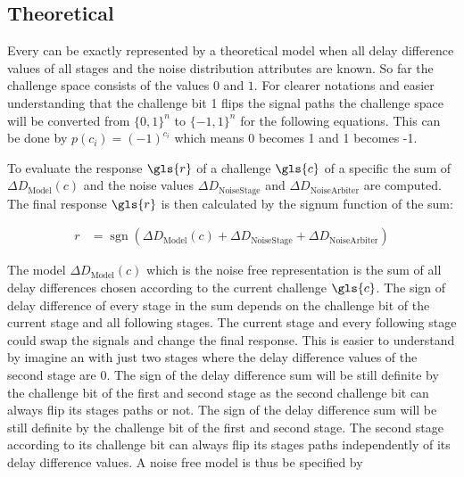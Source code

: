 
\subsection{Theoretical}
\label{sec:theoretical}

Every \apuf can be exactly represented by a theoretical model when all delay difference values of all stages and the noise distribution attributes are known.
So far the challenge space consists of the values $0$ and $1$.
For clearer notations and easier understanding that the challenge bit 1 flips the signal paths the challenge space will be converted from $\{0, 1\}^n$ to $\{-1, 1\}^n$ for the following equations.
This can be done by $p(c_i) = (-1)^{c_i}$ which means 0 becomes 1 and 1 becomes -1.

To evaluate the response $\gls{r}$ of a challenge $\gls{c}$ of a specific \puf the sum of $\Delta D_{\mathrm{Model}}(c)$ and the noise values $\Delta D_{\mathrm{Noise Stage}}$ and $\Delta D_{\mathrm{Noise Arbiter}}$ are computed.
The final response $\gls{r}$ is then calculated by the signum function of the sum:

\begin{align}
r &= \operatorname{sgn}(\Delta D_{\mathrm{Model}}(c) + \Delta D_{\mathrm{Noise Stage}} + \Delta D_{\mathrm{Noise Arbiter}}) \label{equ:pufresponse}
\end{align}

The model $\Delta D_{\mathrm{Model}}(c)$ which is the noise free \apuf representation is the sum of all delay differences chosen according to the current challenge $\gls{c}$.
The sign of delay difference of every stage in the sum depends on the challenge bit of the current stage and all following stages.
The current stage and every following stage could swap the signals and change the final response.
This is easier to understand by imagine an \apuf with just two stages where the delay difference values of the second stage are 0. 
The sign of the delay difference sum will be still definite by the challenge bit of the first and second stage as the second challenge bit can always flip its stages paths or not.
The sign of the delay difference sum will be still definite by the challenge bit of the first and second stage.
The second stage according to its challenge bit can always flip its stages paths independently of its delay difference values.
A noise free \apuf model is thus be specified by

